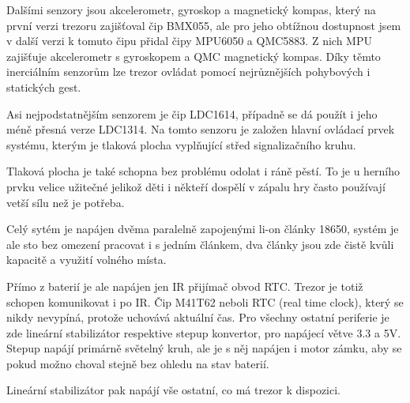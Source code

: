         Dalšími senzory jsou akcelerometr, gyroskop a magnetický kompas, který na první verzi 
        trezoru zajišťoval čip BMX055, ale pro jeho obtížnou dostupnost jsem v další verzi 
        k tomuto čipu přidal čipy MPU6050 a QMC5883. Z nich 
        MPU zajišťuje akcelerometr s gyroskopem a QMC magnetický kompas.
        Díky těmto inerciálním senzorům lze trezor ovládat pomocí nejrůznějších pohybových 
        i statických gest.
        
        Asi nejpodstatnějším senzorem je čip LDC1614, případně se dá použít i jeho méně přesná verze LDC1314.
        Na tomto senzoru je založen hlavní ovládací prvek systému, kterým je tlaková plocha vyplňující střed 
        signalizačního kruhu. %

        Tlaková plocha je také schopna bez problému odolat i ráně pěstí. To je u herního prvku velice užitečné
        jelikož děti i někteří dospělí v zápalu hry často používají vetší sílu než je potřeba.

    Celý sytém je napájen dvěma paralelně zapojenými li-on články 18650, systém je ale sto bez omezení pracovat i s jedním článkem, 
    dva články jsou zde čistě kvůli kapacitě a využití volného místa.
    
    Přímo z baterií je ale napájen jen IR přijímač obvod RTC. Trezor je totiž schopen komunikovat i po IR. 
    Čip M41T62 neboli RTC (real time clock), který se nikdy nevypíná, protože uchovává aktuální čas. %
    Pro všechny ostatní periferie je zde lineární stabilizátor respektive stepup konvertor, pro napájecí větve 3.3 a 5V.
    Stepup napájí primárně světelný kruh, ale je s něj napájen i motor zámku, aby se pokud možno choval stejně bez ohledu na stav baterií.

    Lineární stabilizátor pak napájí vše ostatní, co má trezor k dispozici. %

